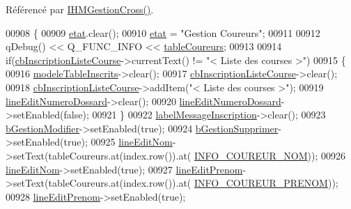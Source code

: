 Référencé par \hyperlink{class_i_h_m_gestion_cross_a2c62fd83326a87456a403f46acc408c8}{I\+H\+M\+Gestion\+Cross()}.


\begin{DoxyCode}
00908 \{
00909     \hyperlink{class_i_h_m_gestion_cross_a5da4390d71dbd5d05cff339f93c7c85a}{etat}.clear();
00910     \hyperlink{class_i_h_m_gestion_cross_a5da4390d71dbd5d05cff339f93c7c85a}{etat} = \textcolor{stringliteral}{"Gestion Coureurs"};
00911 
00912     qDebug() << Q\_FUNC\_INFO << \hyperlink{class_i_h_m_gestion_cross_a9bf93b48403da7bf152f013055152630}{tableCoureurs};
00913 
00914     \textcolor{keywordflow}{if}(\hyperlink{class_i_h_m_gestion_cross_aff44e6f1a225ee5b55783afe72049f83}{cbInscriptionListeCourse}->currentText() != \textcolor{stringliteral}{"< Liste des courses >"})
00915     \{
00916         \hyperlink{class_i_h_m_gestion_cross_a19565551280115e642ceb9790c7317bc}{modeleTableInscrits}->clear();
00917         \hyperlink{class_i_h_m_gestion_cross_aff44e6f1a225ee5b55783afe72049f83}{cbInscriptionListeCourse}->clear();
00918         \hyperlink{class_i_h_m_gestion_cross_aff44e6f1a225ee5b55783afe72049f83}{cbInscriptionListeCourse}->addItem(\textcolor{stringliteral}{"< Liste des courses >"});
00919         \hyperlink{class_i_h_m_gestion_cross_adeb4cfc9a218c06fca5cabc280a611e2}{lineEditNumeroDossard}->clear();
00920         \hyperlink{class_i_h_m_gestion_cross_adeb4cfc9a218c06fca5cabc280a611e2}{lineEditNumeroDossard}->setEnabled(\textcolor{keyword}{false});
00921     \}
00922     \hyperlink{class_i_h_m_gestion_cross_a1855bd63290c39c20660064b41710e8c}{labelMessageInscription}->clear();
00923     \hyperlink{class_i_h_m_gestion_cross_a524ced9992dcc4e7ee25b01e30c4c5df}{bGestionModifier}->setEnabled(\textcolor{keyword}{true});
00924     \hyperlink{class_i_h_m_gestion_cross_adc5bed6caf7f597dd30999bc871e695b}{bGestionSupprimer}->setEnabled(\textcolor{keyword}{true});
00925     \hyperlink{class_i_h_m_gestion_cross_a633102626c5dedd575b51a1ba5c6e708}{lineEditNom}->setText(tableCoureurs.at(index.row()).at(
      \hyperlink{ihmchronocross_8h_a71b99ea06ae916bcd158edbd441c8c24}{INFO\_COUREUR\_NOM}));
00926     \hyperlink{class_i_h_m_gestion_cross_a633102626c5dedd575b51a1ba5c6e708}{lineEditNom}->setEnabled(\textcolor{keyword}{true});
00927     \hyperlink{class_i_h_m_gestion_cross_a7bea7529f01cf8ca8f365d418aae52d5}{lineEditPrenom}->setText(tableCoureurs.at(index.row()).at(
      \hyperlink{ihmchronocross_8h_a68fd2611ad0ef66da1a71726675067e7}{INFO\_COUREUR\_PRENOM}));
00928     \hyperlink{class_i_h_m_gestion_cross_a7bea7529f01cf8ca8f365d418aae52d5}{lineEditPrenom}->setEnabled(\textcolor{keyword}{true});

\end{DoxyCode}
